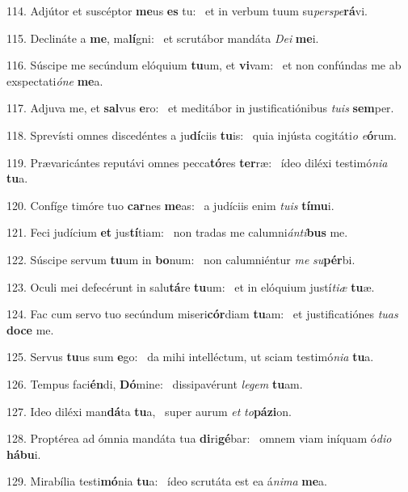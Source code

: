 114. Adjútor et suscéptor \textbf{me}us \textbf{es} tu: \ast\  et in verbum tuum su\textit{per}\textit{spe}\textbf{rá}vi.\

115. Declináte a \textbf{me}, ma\textbf{lí}gni: \ast\  et scrutábor mandáta \textit{De}\textit{i} \textbf{me}i.\

116. Súscipe me secúndum elóquium \textbf{tu}um, et \textbf{vi}vam: \ast\  et non confúndas me ab exspectati\textit{ó}\textit{ne} \textbf{me}a.\

117. Adjuva me, et \textbf{sal}vus \textbf{e}ro: \ast\  et meditábor in justificatiónibus \textit{tu}\textit{is} \textbf{sem}per.\

118. Sprevísti omnes discedéntes a ju\textbf{dí}ciis \textbf{tu}is: \ast\  quia injústa cogitáti\textit{o} \textit{e}\textbf{ó}rum.\

119. Prævaricántes reputávi omnes pecca\textbf{tó}res \textbf{ter}ræ: \ast\  ídeo diléxi testimó\textit{ni}\textit{a} \textbf{tu}a.\

120. Confíge timóre tuo \textbf{car}nes \textbf{me}as: \ast\  a judíciis enim \textit{tu}\textit{is} \textbf{tí}\textbf{mu}i.\

121. Feci judícium \textbf{et} jus\textbf{tí}tiam: \ast\  non tradas me calumni\textit{án}\textit{ti}\textbf{bus} me.\

122. Súscipe servum \textbf{tu}um in \textbf{bo}num: \ast\  non calumniéntur \textit{me} \textit{su}\textbf{pér}bi.\

123. Oculi mei defecérunt in salu\textbf{tá}re \textbf{tu}um: \ast\  et in elóquium justí\textit{ti}\textit{æ} \textbf{tu}æ.\

124. Fac cum servo tuo secúndum miseri\textbf{cór}diam \textbf{tu}am: \ast\  et justificatiónes \textit{tu}\textit{as} \textbf{do}\textbf{ce} me.\

125. Servus \textbf{tu}us sum \textbf{e}go: \ast\  da mihi intelléctum, ut sciam testimó\textit{ni}\textit{a} \textbf{tu}a.\

126. Tempus faci\textbf{én}di, \textbf{Dó}mine: \ast\  dissipavérunt \textit{le}\textit{gem} \textbf{tu}am.\

127. Ideo diléxi man\textbf{dá}ta \textbf{tu}a, \ast\  super aurum \textit{et} \textit{to}\textbf{pá}\textbf{zi}on.\

128. Proptérea ad ómnia mandáta tua \textbf{di}ri\textbf{gé}bar: \ast\  omnem viam iníquam ó\textit{di}\textit{o} \textbf{há}\textbf{bu}i.\

129. Mirabília testi\textbf{mó}nia \textbf{tu}a: \ast\  ídeo scrutáta est ea á\textit{ni}\textit{ma} \textbf{me}a.\

